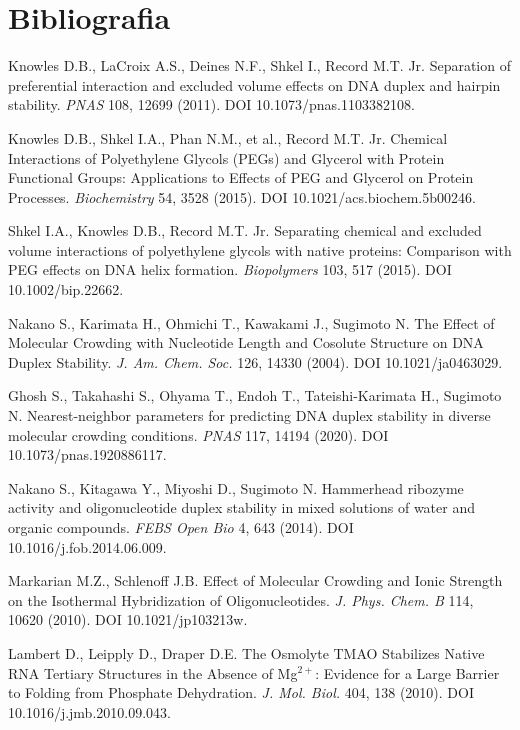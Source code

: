 \documentclass[11pt,a4paper]{article}
\begin{document}
\section*{Bibliografia}
\small
\begin{enumerate}[label={[\arabic*]},ref={\arabic*},leftmargin=*,itemsep=0pt]
\item\label{b:kn11} Knowles D.B., LaCroix A.S., Deines N.F., Shkel I., Record M.T. Jr. Separation of preferential interaction and excluded volume effects on DNA duplex and hairpin stability. \emph{PNAS} 108, 12699 (2011). DOI 10.1073/pnas.1103382108.
\item\label{b:kn15} Knowles D.B., Shkel I.A., Phan N.M., et al., Record M.T. Jr. Chemical Interactions of Polyethylene Glycols (PEGs) and Glycerol with Protein Functional Groups: Applications to Effects of PEG and Glycerol on Protein Processes. \emph{Biochemistry} 54, 3528 (2015). DOI 10.1021/acs.biochem.5b00246.
\item\label{b:shkel} Shkel I.A., Knowles D.B., Record M.T. Jr. Separating chemical and excluded volume interactions of polyethylene glycols with native proteins: Comparison with PEG effects on DNA helix formation. \emph{Biopolymers} 103, 517 (2015). DOI 10.1002/bip.22662.
\item\label{b:nak04} Nakano S., Karimata H., Ohmichi T., Kawakami J., Sugimoto N. The Effect of Molecular Crowding with Nucleotide Length and Cosolute Structure on DNA Duplex Stability. \emph{J. Am. Chem. Soc.} 126, 14330 (2004). DOI 10.1021/ja0463029.
\item\label{b:gh20} Ghosh S., Takahashi S., Ohyama T., Endoh T., Tateishi-Karimata H., Sugimoto N. Nearest-neighbor parameters for predicting DNA duplex stability in diverse molecular crowding conditions. \emph{PNAS} 117, 14194 (2020). DOI 10.1073/pnas.1920886117.
\item\label{b:nak14} Nakano S., Kitagawa Y., Miyoshi D., Sugimoto N. Hammerhead ribozyme activity and oligonucleotide duplex stability in mixed solutions of water and organic compounds. \emph{FEBS Open Bio} 4, 643 (2014). DOI 10.1016/j.fob.2014.06.009.
\item\label{b:mark} Markarian M.Z., Schlenoff J.B. Effect of Molecular Crowding and Ionic Strength on the Isothermal Hybridization of Oligonucleotides. \emph{J. Phys. Chem. B} 114, 10620 (2010). DOI 10.1021/jp103213w.
\item\label{b:llld10} Lambert D., Leipply D., Draper D.E. The Osmolyte TMAO Stabilizes Native RNA Tertiary Structures in the Absence of Mg$^{2+}$: Evidence for a Large Barrier to Folding from Phosphate Dehydration. \emph{J. Mol. Biol.} 404, 138 (2010). DOI 10.1016/j.jmb.2010.09.043.

\end{enumerate}
\end{document}
